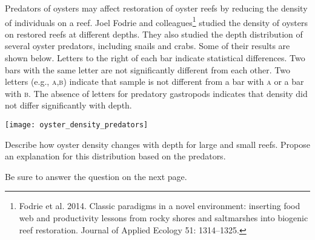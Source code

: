 Predators of oysters may affect restoration of oyster reefs by reducing the density of individuals on a reef. Joel Fodrie and colleagues\footnote{Fodrie et al. 2014. Classic paradigms in a novel environment: inserting food web and productivity lessons from rocky shores and saltmarshes into biogenic reef restoration. Journal of Applied Ecology 51: 1314--1325.} studied the density of oysters on restored reefs at different depths. They also studied the depth distribution of several oyster predators, including snails and crabs. Some of their results are shown below. Letters to the right of each bar indicate statistical differences. Two bars with the same letter are not significantly different from each other. Two letters (e.g., \textsc{a,b}) indicate that sample is not different from a bar with \textsc{a} or a bar with \textsc{b}. The absence of letters for predatory gastropods indicates that density did not differ significantly with depth.

\texttt{[image: oyster\_density\_predators]}

\question[5]\label{question:project}
Describe how oyster density changes with depth for large and small reefs. Propose an explanation for this distribution based on the predators.


{\footnotesize Be sure to answer the question on the next page.}

\newpage

